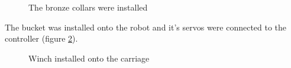 \begin{figure}[H]
\begin{minipage}[h]{0.47\linewidth}
		\caption{The bronze collars were installed}
		\label{Wheelbase1.11}
	\end{minipage}
\end{figure}

The bucket was installed onto the robot and it's servos were connected to the controller (figure \ref{Bucket1.4}).

\begin{figure}[H]
	\begin{minipage}[h]{1\linewidth}
		\caption{Winch installed onto the carriage}
		\label{Bucket1.4}
	\end{minipage}
\end{figure}